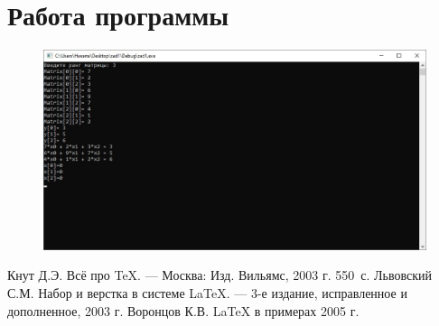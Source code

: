 \documentclass[12pt,a4paper]{scrartcl}
\begin{document}
\section{Работа программы}
\label{sec:picexample}

\begin{figure}[h]
	\centering
	
	\includegraphics[width=1\textwidth]{prog.jpg}
\end{figure}

\begin{thebibliography}{9}
Кнут Д.Э. Всё про \TeX. \newblock --- Москва: Изд. Вильямс, 2003 г. 550~с.
Львовский С.М. Набор и верстка в системе \LaTeX{}. \newblock --- 3-е издание, исправленное и дополненное, 2003 г.
Воронцов К.В. \LaTeX{} в примерах 2005 г.
\end{thebibliography}
\end{document}
